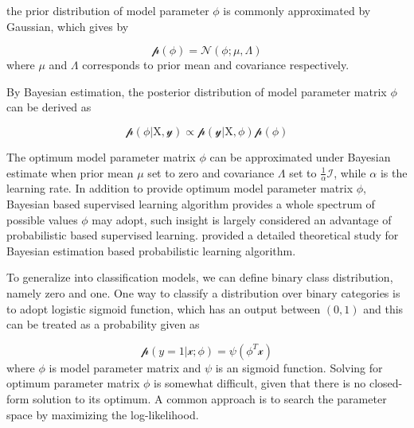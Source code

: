 the prior distribution of model parameter $\phi$ is commonly approximated by Gaussian, which gives by 

\begin{equation}
    \mathcal{p}(\phi) = \mathcal{N}(\mathcal{\phi}; \mu, \Lambda)
\end{equation}
where $\mu$ and $\Lambda$ corresponds to prior mean and covariance respectively. 

By Bayesian estimation, the posterior distribution of model parameter matrix $\phi$ can be derived as 

\begin{equation}
    \mathcal{p}(\phi|\mathrm{X},\mathcal{y}) \propto \mathcal{p}(\mathcal{y}|\mathrm{X}, \phi)\mathcal{p}(\phi)
\end{equation}

The optimum model parameter matrix $\phi$ can be approximated under Bayesian estimate when prior mean $\mu$ set to zero and covariance $\Lambda$ set to $\frac{1}{\alpha}\mathcal{I}$, while $\alpha$ is the learning rate. In addition to provide optimum model parameter matrix $\phi$, Bayesian based supervised learning algorithm provides a whole spectrum of possible values $\phi$ may adopt, such insight is largely considered an advantage of probabilistic based supervised learning. \citet{Goodfellow-et-al-2016} provided a detailed theoretical study for Bayesian estimation based probabilistic learning algorithm. 
\par 

To generalize into classification models, we can define binary class distribution, namely zero and one. One way to classify a distribution over binary categories is to adopt logistic sigmoid function, which has an output between $(0,1)$ and this can be treated as a probability given as 

\begin{equation}
    \mathcal{p}(y=1|\mathcal{x};\phi) = \psi(\phi^T\mathcal{x})
\end{equation}
where $\phi$ is model parameter matrix and $\psi$ is an sigmoid function. Solving for optimum parameter matrix $\phi$ is somewhat difficult, given that there is no closed-form solution to its optimum. A common approach is to search the parameter space by maximizing the log-likelihood. 

